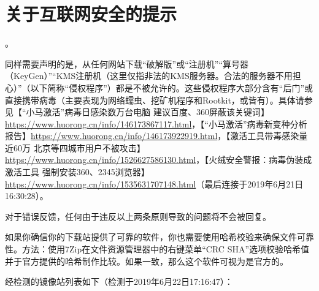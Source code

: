 \documentclass{book}
\begin{document}
\section{关于互联网安全的提示}
\begin{window}
{}。\par 同样需要声明的是，从任何网站下载“破解版”或“注册机”“算号器（KeyGen）”“KMS注册机（这里仅指非法的KMS服务器。合法的服务器不用担心）”（以下简称“侵权程序”）都是不被允许的。这些侵权程序大部分含有“后门”或直接携带病毒（主要表现为网络蠕虫、挖矿机程序和Rootkit，或皆有）。具体请参见【“小马激活”病毒日感染数万台电脑 建议百度、360屏蔽该关键词】\url{https://www.huorong.cn/info/146173867117.html}，【“小马激活”病毒新变种分析报告】\url{https://www.huorong.cn/info/146173922919.html}，【激活工具带毒感染量近60万 北京等四城市用户不被攻击】\url{https://www.huorong.cn/info/1526627586130.html}，【火绒安全警报：病毒伪装成激活工具  强制安装360、2345浏览器】\url{https://www.huorong.cn/info/1535631707148.html}（最后连接于2019年6月21日16:30:28）。\par 对于错误反馈，任何由于违反以上两条原则导致的问题将不会被回复。\par 如果你确信你的下载站提供了可靠的软件，你也需要使用哈希校验来确保文件可靠性。方法：使用7Zip在文件资源管理器中的右键菜单“CRC SHA”选项校验哈希值并于官方提供的哈希制作比较。如果一致，那么这个软件可视为是官方的。
\end{window}
经检测的镜像站列表如下（检测于2019年6月22日17:16:47）：
\end{document}

